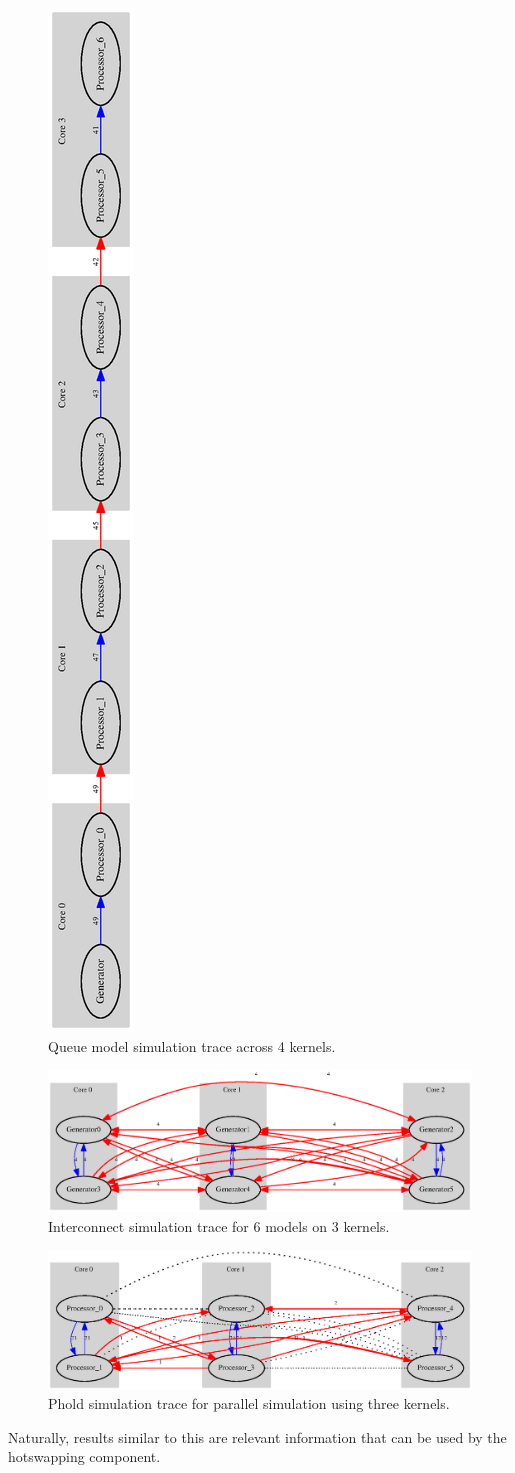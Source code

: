 \begin{figure}
    \center
    \includegraphics[height=\textwidth, angle=-90 ]{fig/queue_allocation.eps}
    \caption{Queue model simulation trace across 4 kernels.}
    \label{fig:Queue_allocation}
\end{figure}
\begin{figure}
    \center
    \includegraphics[width=\plotfraction\columnwidth]{fig/interconnect_parallel_allocation.eps}
    \caption{Interconnect simulation trace for 6 models on 3 kernels.}
    \label{fig:interconnect_allocation_parallel}
\end{figure}
\begin{figure}
    \center
    \includegraphics[width=\plotfraction\columnwidth]{fig/phold_parallel_allocation.eps}
    \caption{Phold simulation trace for parallel simulation using three kernels.}
    \label{fig:phold_allocation}
\end{figure}

Naturally, results similar to this are relevant information that can be used by the hotswapping component.

